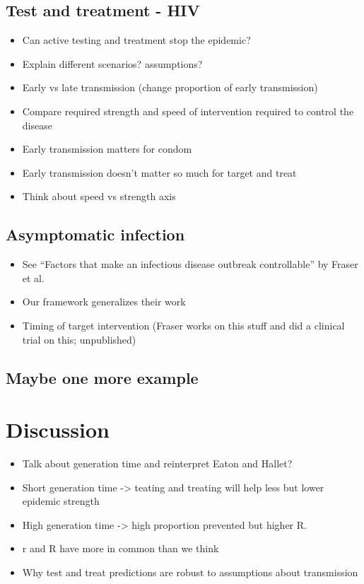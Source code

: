 \documentclass{article}\usepackage[]{graphicx}\usepackage[]{color}
\begin{document}
\subsection{Test and treatment - HIV}

\begin{itemize}
	\item Can active testing and treatment stop the epidemic?
	\item Explain different scenarios? assumptions?
	\item Early vs late transmission (change proportion of early transmission)
	\item Compare required strength and speed of intervention required to control the disease
	\item Early transmission matters for condom
	\item Early transmission doesn't matter so much for target and treat
	\item Think about speed vs strength axis
\end{itemize}

\subsection{Asymptomatic infection}

\begin{itemize}
	\item See ``Factors that make an infectious disease outbreak controllable'' by Fraser et al.
	\item Our framework generalizes their work
	\item Timing of target intervention (Fraser works on this stuff and did a clinical trial on this; unpublished)
\end{itemize}

\subsection{Maybe one more example}

\section{Discussion}


\begin{itemize}
	\item Talk about generation time and reinterpret Eaton and Hallet?
	\item Short generation time -> teating and treating will help less but lower epidemic strength
	\item High generation time -> high proportion prevented but higher R.
\end{itemize}

\begin{itemize}
	\item r and R have more in common than we think
	\item Why test and treat predictions are robust to assumptions about transmission
\end{itemize}
\end{document}
